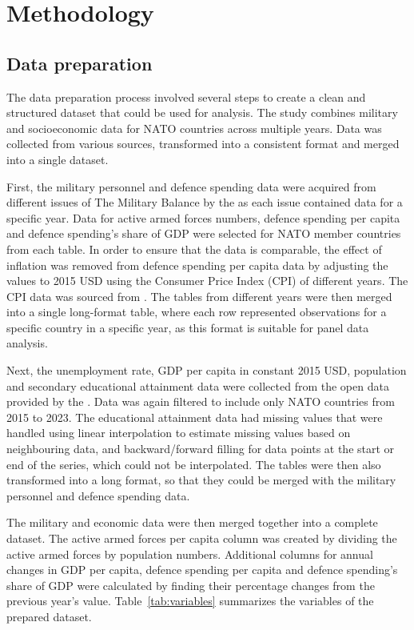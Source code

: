 \chapter{Methodology}

\section{Data preparation}

The data preparation process involved several steps to create a clean and structured 
dataset that could be used for analysis. The study combines military and socioeconomic 
data for NATO countries across multiple years. Data was collected from various sources,
transformed into a consistent format and merged into a single dataset.

First, the military personnel and defence 
spending data were acquired from different issues of The Military Balance by the 
\textcite{noauthor_military_balance_nodate} 
as each issue contained data for a specific year. Data for active armed forces numbers, 
defence spending per capita and defence spending's share of GDP were
selected for NATO member countries from each table.
In order to ensure that the data is comparable, the effect of inflation was removed 
from defence spending per capita data by adjusting the values to 2015 USD using the Consumer Price 
Index (CPI) of different years. The CPI data was sourced from \textcite{federal_reserve_bank_of_minneapolis_consumer_nodate}. 
The tables from different years were then merged into a single long-format table, where
each row represented observations for a specific country in a specific year, as this format is 
suitable for panel data analysis.

Next, the unemployment rate, GDP per capita in constant 2015 USD, population and 
secondary educational attainment data were collected from the open data provided by the
\textcite{noauthor_world_bank_nodate}. Data was again filtered to include 
only NATO countries from 2015 to 2023. 
The educational attainment 
data had missing values that were handled using linear interpolation to estimate missing values 
based on neighbouring data, and backward/forward filling for data points at the start or end 
of the series, which could not be interpolated. The tables were then also transformed into a long format, 
so that they could be 
merged with the military personnel and defence spending data.

The military and economic data were then merged together into a complete dataset. 
The active armed forces per capita column was created by dividing the active armed forces by population numbers.
Additional columns for annual changes in GDP per capita, defence spending per capita  
and defence spending's share of GDP were calculated by finding their percentage changes from 
the previous year's value. Table~\ref{tab:variables} summarizes the variables of the prepared dataset.

